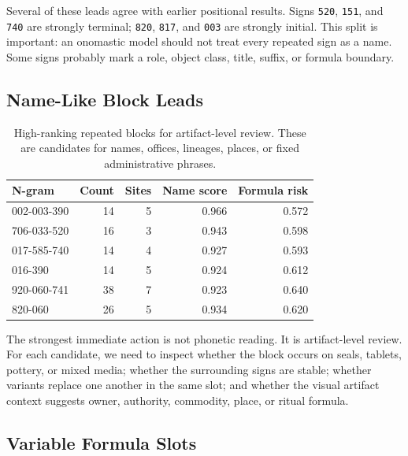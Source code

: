 Several of these leads agree with earlier positional results. Signs \texttt{520}, \texttt{151}, and \texttt{740} are strongly terminal; \texttt{820}, \texttt{817}, and \texttt{003} are strongly initial. This split is important: an onomastic model should not treat every repeated sign as a name. Some signs probably mark a role, object class, title, suffix, or formula boundary.

\subsection{Name-Like Block Leads}

\begin{table}[htbp]
\centering
\begin{tabular}{lrrrr}
\toprule
\textbf{N-gram} & \textbf{Count} & \textbf{Sites} & \textbf{Name score} & \textbf{Formula risk} \\
\midrule
002-003-390 & 14 & 5 & 0.966 & 0.572 \\
706-033-520 & 16 & 3 & 0.943 & 0.598 \\
017-585-740 & 14 & 4 & 0.927 & 0.593 \\
016-390 & 14 & 5 & 0.924 & 0.612 \\
920-060-741 & 38 & 7 & 0.923 & 0.640 \\
820-060 & 26 & 5 & 0.934 & 0.620 \\
\bottomrule
\end{tabular}
\caption{High-ranking repeated blocks for artifact-level review. These are candidates for names, offices, lineages, places, or fixed administrative phrases.}
\label{tab:name-like-block-leads}
\end{table}

The strongest immediate action is not phonetic reading. It is artifact-level review. For each candidate, we need to inspect whether the block occurs on seals, tablets, pottery, or mixed media; whether the surrounding signs are stable; whether variants replace one another in the same slot; and whether the visual artifact context suggests owner, authority, commodity, place, or ritual formula.

\subsection{Variable Formula Slots}

